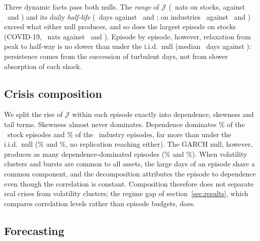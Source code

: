 \documentclass[12pt]{article}
\theoremstyle{definition}
\theoremstyle{remark}
\newcommand{\JJ}{\mathcal{J}}
\begin{document}
\begin{doublespace}
Three dynamic facts pass both nulls. The \emph{range} of $\JJ$
(\qRangeSpObs~nats on stocks, against \qRangeSpIid\ and \qRangeSpFhs) and its
daily \emph{half-life} (\qHalfLifeSpObs\ days against \qHalfLifeSpIid\ and
\qHalfLifeSpFhs; on industries \qHalfLifeFfObs\ against \qHalfLifeFfIid\ and
\qHalfLifeFfFhs) exceed what either null produces, and so does the largest
episode on stocks (COVID-19, \qMaxEpSpObs~nats against \qMaxEpSpIid\ and
\qMaxEpSpFhs). Episode by episode, however, relaxation from peak to half-way is
no slower than under the i.i.d.\ null (median \qEpHalfLifeSpObs\ days against
\qEpHalfLifeSpIid): persistence comes from the succession of turbulent days,
not from slower absorption of each shock.

\subsection{Crisis composition}

We split the rise of $\JJ$ within each episode exactly into dependence,
skewness and tail terms. Skewness almost never dominates. Dependence
dominates \qDepDomSpObs\% of the \qEpUpSpObs\ stock episodes and \qDepDomFfObs\%
of the \qEpUpFfObs\ industry episodes, far more than under the i.i.d.\ null
(\qDepDomSpIid\% and \qDepDomFfIid\%, no replication reaching either). The
GARCH null, however, produces as many dependence-dominated episodes
(\qDepDomSpFhs\% and \qDepDomFfFhs\%). When volatility clusters and bursts are
common to all assets, the large days of an episode share a common component,
and the decomposition attributes the episode to dependence even though the
correlation is constant. Composition therefore does not separate real crises
from volatility clusters; the regime gap of section~\ref{sec:results}, which
compares correlation levels rather than episode budgets, does.

\subsection{Forecasting}


\end{doublespace}
\end{document}
